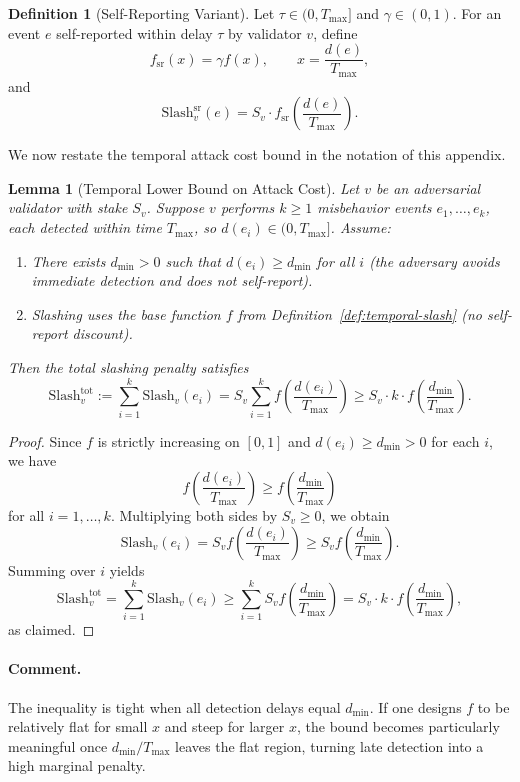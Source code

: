 \documentclass[11pt]{article}
\theoremstyle{plain}
\newtheorem{lemma}{Lemma}
\theoremstyle{definition}
\newtheorem{definition}{Definition}
\begin{document}
\begin{definition}[Self-Reporting Variant]
\label{def:self-report}
Let \(\tau \in (0,T_{\max}]\) and \(\gamma \in (0,1)\). For an event \(e\) self-reported within delay \(\tau\) by validator \(v\), define
\[
f_{\mathrm{sr}}(x) = \gamma f(x), \qquad x = \frac{d(e)}{T_{\max}},
\]
and
\[
\mathrm{Slash}^{\mathrm{sr}}_v(e) = S_v \cdot f_{\mathrm{sr}}\!\left(\frac{d(e)}{T_{\max}}\right).
\]
\end{definition}

We now restate the temporal attack cost bound in the notation of this appendix.

\begin{lemma}[Temporal Lower Bound on Attack Cost]
\label{lem:attack-cost-app}
Let \(v\) be an adversarial validator with stake \(S_v\). Suppose \(v\) performs \(k \ge 1\) misbehavior events \(e_1,\dots,e_k\), each detected within time \(T_{\max}\), so \(d(e_i)\in(0,T_{\max}]\). Assume:
\begin{enumerate}[leftmargin=*]
  \item There exists \(d_{\min} > 0\) such that \(d(e_i) \ge d_{\min}\) for all \(i\) (the adversary avoids immediate detection and does not self-report).
  \item Slashing uses the base function \(f\) from Definition~\ref{def:temporal-slash} (no self-report discount).
\end{enumerate}
Then the total slashing penalty satisfies
\[
\mathrm{Slash}^{\mathrm{tot}}_v
:= \sum_{i=1}^k \mathrm{Slash}_v(e_i)
= S_v \sum_{i=1}^k f\!\left(\frac{d(e_i)}{T_{\max}}\right)
\ge S_v \cdot k \cdot f\!\left(\frac{d_{\min}}{T_{\max}}\right).
\]
\end{lemma}

\begin{proof}
Since \(f\) is strictly increasing on \([0,1]\) and \(d(e_i) \ge d_{\min} > 0\) for each \(i\), we have
\[
f\!\left(\frac{d(e_i)}{T_{\max}}\right)
\ge f\!\left(\frac{d_{\min}}{T_{\max}}\right)
\]
for all \(i = 1,\dots,k\). Multiplying both sides by \(S_v \ge 0\), we obtain
\[
\mathrm{Slash}_v(e_i)
= S_v f\!\left(\frac{d(e_i)}{T_{\max}}\right)
\ge S_v f\!\left(\frac{d_{\min}}{T_{\max}}\right).
\]
Summing over \(i\) yields
\[
\mathrm{Slash}^{\mathrm{tot}}_v
= \sum_{i=1}^k \mathrm{Slash}_v(e_i)
\ge \sum_{i=1}^k S_v f\!\left(\frac{d_{\min}}{T_{\max}}\right)
= S_v \cdot k \cdot f\!\left(\frac{d_{\min}}{T_{\max}}\right),
\]
as claimed.
\end{proof}

\paragraph{Comment.}
The inequality is tight when all detection delays equal \(d_{\min}\). If one designs \(f\) to be relatively flat for small \(x\) and steep for larger \(x\), the bound becomes particularly meaningful once \(d_{\min}/T_{\max}\) leaves the flat region, turning late detection into a high marginal penalty.
\end{document}
